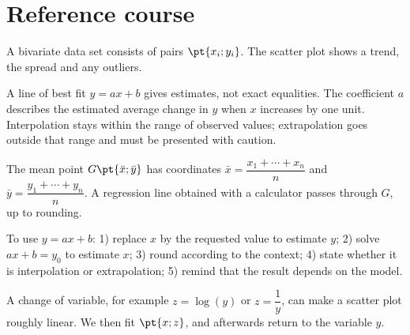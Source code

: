 
\section{Reference course}
A bivariate data set consists of pairs $\pt{x_i;y_i}$. The scatter plot shows a trend, the spread and any outliers.

\begin{center}
\end{center}

\begin{keypoint}
A line of best fit $y=ax+b$ gives estimates, not exact equalities. The coefficient $a$ describes the estimated average change in $y$ when $x$ increases by one unit. Interpolation stays within the range of observed values; extrapolation goes outside that range and must be presented with caution.
\end{keypoint}

The mean point $G\pt{\bar x;\bar y}$ has coordinates $\bar x=\dfrac{x_1+\cdots+x_n}{n}$ and $\bar y=\dfrac{y_1+\cdots+y_n}{n}$. A regression line obtained with a calculator passes through $G$, up to rounding.

\begin{method}
To use $y=ax+b$: 1) replace $x$ by the requested value to estimate $y$; 2) solve $ax+b=y_0$ to estimate $x$; 3) round according to the context; 4) state whether it is interpolation or extrapolation; 5) remind that the result depends on the model.
\end{method}

A change of variable, for example $z=\log(y)$ or $z=\dfrac1y$, can make a scatter plot roughly linear. We then fit $\pt{x;z}$, and afterwards return to the variable $y$.

